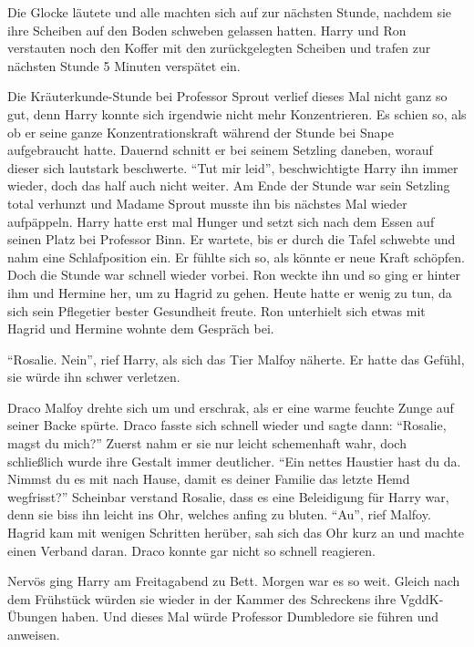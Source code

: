 Die Glocke läutete und alle machten sich auf zur nächsten Stunde, nachdem sie ihre Scheiben auf den Boden schweben gelassen hatten. Harry und Ron verstauten noch den Koffer mit den zurückgelegten Scheiben und trafen zur nächsten Stunde 5 Minuten verspätet ein.

Die Kräuterkunde-Stunde bei Professor Sprout verlief dieses Mal nicht ganz so gut, denn Harry konnte sich irgendwie nicht mehr Konzentrieren. Es schien so, als ob er seine ganze Konzentrationskraft während der Stunde bei Snape aufgebraucht hatte. Dauernd schnitt er bei seinem Setzling daneben, worauf dieser sich lautstark beschwerte. \enquote{Tut mir leid}, beschwichtigte Harry ihn immer wieder, doch das half auch nicht weiter. Am Ende der Stunde war sein Setzling total verhunzt und Madame Sprout musste ihn bis nächstes Mal wieder aufpäppeln. Harry hatte erst mal Hunger und setzt sich nach dem Essen auf seinen Platz bei Professor Binn. Er wartete, bis er durch die Tafel schwebte und nahm eine Schlafposition ein. Er fühlte sich so, als könnte er neue Kraft schöpfen. Doch die Stunde war schnell wieder vorbei. Ron weckte ihn und so ging er hinter ihm und Hermine her, um zu Hagrid zu gehen. Heute hatte er wenig zu tun, da sich sein Pflegetier bester Gesundheit freute.
Ron unterhielt sich etwas mit Hagrid und Hermine wohnte dem Gespräch bei.

\enquote{Rosalie. Nein}, rief Harry, als sich das Tier Malfoy näherte. Er hatte das Gefühl, sie würde ihn schwer verletzen.

Draco Malfoy drehte sich um und erschrak, als er eine warme feuchte Zunge auf seiner Backe spürte. Draco fasste sich schnell wieder und sagte dann: \enquote{Rosalie, magst du mich?} Zuerst nahm er sie nur leicht schemenhaft wahr, doch schließlich wurde ihre Gestalt immer deutlicher. \enquote{Ein nettes Haustier hast du da. Nimmst du es mit nach Hause, damit es deiner Familie das letzte Hemd wegfrisst?} Scheinbar verstand Rosalie, dass es eine Beleidigung für Harry war, denn sie biss ihn leicht ins Ohr, welches anfing zu bluten. \enquote{Au}, rief Malfoy. Hagrid kam mit wenigen Schritten herüber, sah sich das Ohr kurz an und machte einen Verband daran. Draco konnte gar nicht so schnell reagieren.

\trenn

Nervös ging Harry am Freitagabend zu Bett. Morgen war es so weit. Gleich nach dem Frühstück würden sie wieder in der Kammer des Schreckens ihre VgddK-Übungen haben. Und dieses Mal würde Professor Dumbledore sie führen und anweisen.

